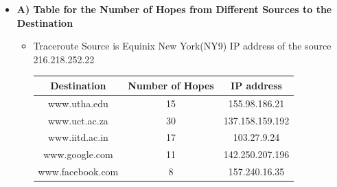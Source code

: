 \documentclass{article}
\begin{document}
\begin{itemize}
    \item  \textbf{A) Table for the Number of Hopes from Different Sources to the Destination} \\
    \begin{itemize}
    \item Traceroute Source is Equinix New York(NY9) IP address of the source  216.218.252.22 \\ 
    \begin{center}
\begin{tabular}{|c|c|c|}
    \hline
     Destination & Number of Hopes & IP address  \\
    \hline
    www.utha.edu & 15 &  155.98.186.21 \\
    \hline
    www.uct.ac.za & 30 & 137.158.159.192\\
    \hline
    www.iitd.ac.in & 17 & 103.27.9.24 \\
    \hline 
    www.google.com  &   11   & 142.250.207.196 \\ 
    \hline
    www.facebook.com &  8  & 157.240.16.35 \\  
    \hline
    \end{tabular}
\end{center}


\end{itemize}
\end{itemize}
\end{document}
